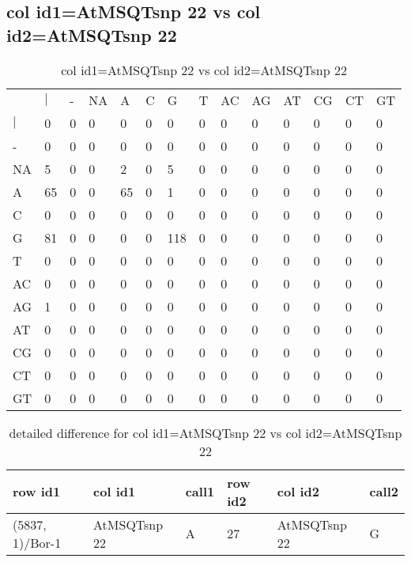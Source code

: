 \subsection{col id1=AtMSQTsnp 22 vs col id2=AtMSQTsnp 22}
\begin{center}
\begin{longtable}{|l|l|l|l|l|l|l|l|l|l|l|l|l|l|}
\caption{col id1=AtMSQTsnp 22 vs col id2=AtMSQTsnp 22} \label{table_dm782}\\
\hline
\\
\hline
&$|$&-&NA&A&C&G&T&AC&AG&AT&CG&CT&GT\\
$|$&0&0&0&0&0&0&0&0&0&0&0&0&0\\
-&0&0&0&0&0&0&0&0&0&0&0&0&0\\
NA&5&0&0&2&0&5&0&0&0&0&0&0&0\\
A&65&0&0&65&0&1&0&0&0&0&0&0&0\\
C&0&0&0&0&0&0&0&0&0&0&0&0&0\\
G&81&0&0&0&0&118&0&0&0&0&0&0&0\\
T&0&0&0&0&0&0&0&0&0&0&0&0&0\\
AC&0&0&0&0&0&0&0&0&0&0&0&0&0\\
AG&1&0&0&0&0&0&0&0&0&0&0&0&0\\
AT&0&0&0&0&0&0&0&0&0&0&0&0&0\\
CG&0&0&0&0&0&0&0&0&0&0&0&0&0\\
CT&0&0&0&0&0&0&0&0&0&0&0&0&0\\
GT&0&0&0&0&0&0&0&0&0&0&0&0&0\\
\hline
\end{longtable}
\end{center}

\begin{center}
\begin{longtable}{|l|l|l|l|l|l|}
\caption{detailed difference for col id1=AtMSQTsnp 22 vs col id2=AtMSQTsnp 22} \label{table_dm783}\\
\hline
row id1&col id1&call1&row id2&col id2&call2\\
\hline
(5837, 1)/Bor-1&AtMSQTsnp 22&A&27&AtMSQTsnp 22&G\\
\hline
\end{longtable}
\end{center}

